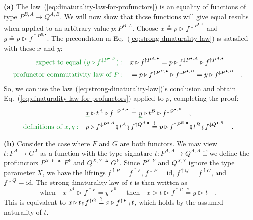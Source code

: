 \textbf{(a)} The law~(\ref{eq:dinaturality-law-for-profunctors})
is an equality of functions of type $P^{B,A}\rightarrow Q^{A,B}$.
We will now show that those functions will give equal results when
applied to an arbitrary value $p:P^{B,A}$. Choose $x\triangleq p\triangleright f^{\downarrow P^{\bullet,A}}$
and $y\triangleq p\triangleright f^{\uparrow P^{B,\bullet}}$. The
precondition in Eq.~(\ref{eq:strong-dinaturality-law}) is satisfied
with these $x$ and $y$:
\begin{align*}
{\color{greenunder}\text{expect to equal }(y\triangleright f^{\downarrow P^{\bullet,B}}):}\quad & x\triangleright f^{\uparrow P^{A,\bullet}}=p\triangleright f^{\downarrow P^{\bullet,A}}\triangleright f^{\uparrow P^{A,\bullet}}\\
{\color{greenunder}\text{profunctor commutativity law of }P:}\quad & =p\triangleright f^{\uparrow P^{B,\bullet}}\triangleright f^{\downarrow P^{\bullet,B}}=y\triangleright f^{\downarrow P^{\bullet,B}}\quad.
\end{align*}
So, we can use the law~(\ref{eq:strong-dinaturality-law})\textsf{'}s conclusion
and obtain Eq.~(\ref{eq:dinaturality-law-for-profunctors}) applied
to $p$, completing the proof:
\begin{align*}
 & \gunderline x\triangleright t^{A}\triangleright f^{\uparrow Q^{A,\bullet}}\overset{!}{=}\gunderline y\triangleright t^{B}\triangleright f^{\downarrow Q^{\bullet,B}}\quad,\\
{\color{greenunder}\text{definitions of }x,y:}\quad & p\triangleright f^{\downarrow P^{\bullet,A}}\bef t^{A}\bef f^{\uparrow Q^{A,\bullet}}\overset{!}{=}p\triangleright f^{\uparrow P^{B,\bullet}}\bef t^{B}\bef f^{\downarrow Q^{\bullet,B}}\quad.
\end{align*}

\textbf{(b)} Consider the case where $F$ and $G$ are both functors.
We may view $t:F^{A}\rightarrow G^{A}$ as a function with the type
signature $t:P^{A,A}\rightarrow Q^{A,A}$ if we define the profunctors
$P^{X,Y}\triangleq F^{Y}$ and $Q^{X,Y}\triangleq G^{Y}$. Since $P^{X,Y}$
and $Q^{X,Y}$ ignore the type parameter $X$, we have the liftings
$f^{\uparrow P}=f^{\uparrow F}$, $f^{\downarrow P}=\text{id}$, $f^{\uparrow Q}=f^{\uparrow G}$,
and $f^{\downarrow Q}=\text{id}$. The strong dinaturality law of
$t$ is then written as
\[
\text{when}\quad x^{:F^{A}}\triangleright f^{\uparrow F}=y^{:F^{B}}\quad\text{ then}\quad x\triangleright t\triangleright f^{\uparrow G}\overset{?}{=}y\triangleright t\quad.
\]
This is equivalent to $x\triangleright t\bef f^{\uparrow G}\overset{?}{=}x\triangleright f^{\uparrow F}\bef t$,
which holds by the assumed naturality of $t$.

